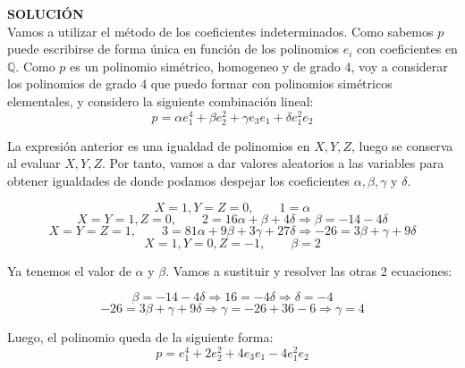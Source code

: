 \documentclass[a4paper]{article}
\begin{document}
\textbf{SOLUCIÓN}
\\

Vamos a utilizar el método de los coeficientes indeterminados. Como sabemos $p$ puede escribirse de forma única en función de los polinomios $e_i$ con coeficientes en $\mathds{Q}$. Como $p$ es un polinomio simétrico, homogeneo y de grado 4, voy a considerar los polinomios de grado 4 que puedo formar con polinomios simétricos elementales, y considero la siguiente combinación lineal:
\begin{equation*}
p = \alpha e_1^4 + \beta e_2^2 + \gamma e_3e_1 + \delta e_1^2e_2
\end{equation*}

La expresión anterior es una igualdad de polinomios en $X,Y,Z$, luego se conserva al evaluar $X,Y,Z$. Por tanto, vamos a dar valores aleatorios a las variables para obtener igualdades de donde podamos despejar los coeficientes $\alpha,\beta,\gamma$ y $\delta$.

\begin{equation*}
X=1, Y=Z=0, \qquad 1 = \alpha
\end{equation*}
\begin{equation*}
X=Y=1, Z=0, \qquad 2 = 16\alpha + \beta + 4\delta \Rightarrow \beta=-14-4\delta
\end{equation*}
\begin{equation*}
X=Y=Z=1, \qquad 3 = 81\alpha + 9\beta + 3\gamma + 27\delta \Rightarrow -26 = 3\beta + \gamma + 9\delta
\end{equation*}
\begin{equation*}
X=1,Y=0,Z=-1, \qquad \beta = 2
\end{equation*}

Ya tenemos el valor de $\alpha$ y $\beta$. Vamos a sustituir y resolver las otras 2 ecuaciones:

\begin{equation*}
\beta=-14-4\delta \Rightarrow 16 = -4\delta \Rightarrow \delta=-4
\end{equation*}
\begin{equation*}
-26 = 3\beta + \gamma + 9\delta \Rightarrow \gamma = -26 +36 -6 \Rightarrow \gamma = 4
\end{equation*}

Luego, el polinomio queda de la siguiente forma:
\begin{equation*}
p = e_1^4 + 2e_2^2 +4e_3e_1 -4e_1^2e_2
\end{equation*}
\end{document}
